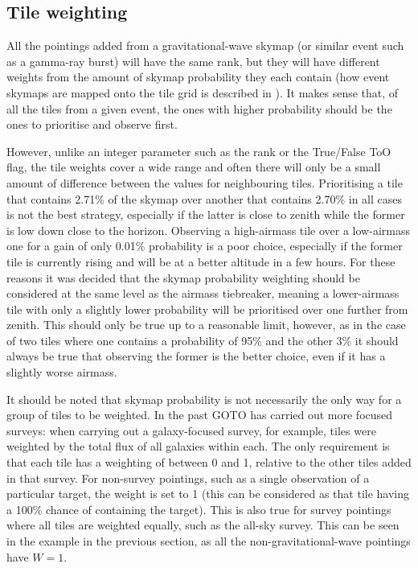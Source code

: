 \subsection{Tile weighting}
\label{sec:weights}
\begin{colsection}

All the pointings added from a gravitational-wave skymap (or similar event such as a gamma-ray burst) will have the same rank, but they will have different weights from the amount of skymap probability they each contain (how event skymaps are mapped onto the tile grid is described in ). It makes sense that, of all the tiles from a given event, the ones with higher probability should be the ones to prioritise and observe first.

However, unlike an integer parameter such as the rank or the True/False ToO flag, the tile weights cover a wide range and often there will only be a small amount of difference between the values for neighbouring tiles. Prioritising a tile that contains 2.71\% of the skymap over another that contains 2.70\% in all cases is not the best strategy, especially if the latter is close to zenith while the former is low down close to the horizon. Observing a high-airmass tile over a low-airmass one for a gain of only 0.01\% probability is a poor choice, especially if the former tile is currently rising and will be at a better altitude in a few hours. For these reasons it was decided that the skymap probability weighting should be considered at the same level as the airmass tiebreaker, meaning a lower-airmass tile with only a slightly lower probability will be prioritised over one further from zenith. This should only be true up to a reasonable limit, however, as in the case of two tiles where one contains a probability of 95\% and the other 3\% it should always be true that observing the former is the better choice, even if it has a slightly worse airmass.

It should be noted that skymap probability is not necessarily the only way for a group of tiles to be weighted. In the past GOTO has carried out more focused surveys: when carrying out a galaxy-focused survey, for example, tiles were weighted by the total flux of all galaxies within each. The only requirement is that each tile has a weighting of between 0 and 1, relative to the other tiles added in that survey. For non-survey pointings, such as a single observation of a particular target, the weight is set to 1 (this can be considered as that tile having a 100\% chance of containing the target). This is also true for survey pointings where all tiles are weighted equally, such as the all-sky survey. This can be seen in the example  in the previous section, as all the non-gravitational-wave pointings have $W=1$.

\newpage

\end{colsection}

